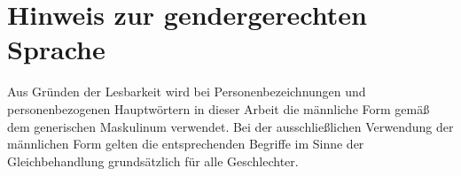 \section*{Hinweis zur gendergerechten Sprache}

	Aus Gründen der Lesbarkeit wird bei Personenbezeichnungen und personenbezogenen Hauptwörtern in dieser Arbeit die männliche Form gemäß dem generischen Maskulinum verwendet. Bei der ausschließlichen Verwendung der männlichen Form gelten die entsprechenden Begriffe im Sinne der Gleichbehandlung grundsätzlich für alle Geschlechter.